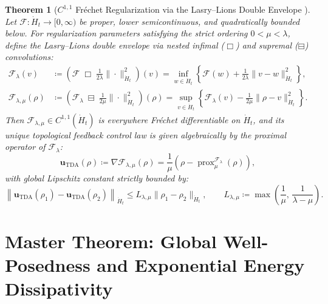 \documentclass[11pt,a4paper,reqno]{article}
\newtheorem{theorem}{Theorem}[section]
\theoremstyle{definition}
\theoremstyle{remark}
\begin{document}
\begin{theorem}[$C^{1,1}$ Fréchet Regularization via the Lasry--Lions Double Envelope \cite{lasry1986remarks, attouch1993approximation, ananda2026stochastic_fluid_v2}]\label{thm:lasry_lions}
Let $\mathcal{F} : \dot{H}_t \to [0, \infty)$ be proper, lower semicontinuous, and quadratically bounded below. For regularization parameters satisfying the strict ordering $0 < \mu < \lambda$, define the Lasry--Lions double envelope via nested infimal ($\Box$) and supremal ($\boxminus$) convolutions:
\begin{align}\label{eq:lasry_lions_def}
  \mathcal{F}_\lambda(v) &\coloneqq \left(\mathcal{F} \;\Box\; \frac{1}{2\lambda}\|\cdot\|_{\dot{H}_t}^2\right)(v) = \inf_{w \in \dot{H}_t} \left\{ \mathcal{F}(w) + \frac{1}{2\lambda}\|v - w\|_{\dot{H}_t}^2 \right\}, \\
  \mathcal{F}_{\lambda,\mu}(\rho) &\coloneqq \left(\mathcal{F}_\lambda \;\boxminus\; \frac{1}{2\mu}\|\cdot\|_{\dot{H}_t}^2\right)(\rho) = \sup_{v \in \dot{H}_t} \left\{ \mathcal{F}_\lambda(v) - \frac{1}{2\mu}\|\rho - v\|_{\dot{H}_t}^2 \right\}.
\end{align}
Then $\mathcal{F}_{\lambda,\mu} \in C^{1,1}(\dot{H}_t)$ is everywhere Fréchet differentiable on $\dot{H}_t$, and its unique topological feedback control law is given algebraically by the proximal operator of $\mathcal{F}_\lambda$:
\begin{equation}\label{eq:lasry_lions_grad}
  \mathbf{u}_{\mathrm{TDA}}(\rho) \coloneqq \nabla \mathcal{F}_{\lambda,\mu}(\rho) = \frac{1}{\mu}\left( \rho - \operatorname{prox}_{\mu}^{\mathcal{F}_\lambda}(\rho) \right),
\end{equation}
with global Lipschitz constant strictly bounded by:
\begin{equation}\label{eq:lasry_lipschitz_bound}
  \left\| \mathbf{u}_{\mathrm{TDA}}(\rho_1) - \mathbf{u}_{\mathrm{TDA}}(\rho_2) \right\|_{\dot{H}_t} \le L_{\lambda,\mu} \|\rho_1 - \rho_2\|_{\dot{H}_t}, \qquad L_{\lambda,\mu} \coloneqq \max\!\left(\frac{1}{\mu},\, \frac{1}{\lambda - \mu}\right).
\end{equation}
\end{theorem}

\section{Master Theorem: Global Well-Posedness and Exponential Energy Dissipativity}
\end{document}
